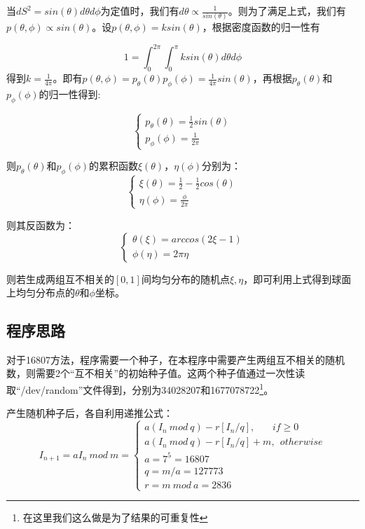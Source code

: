 \documentclass[a4paper,11pt]{article}
\begin{document}
当$d S^{2}= sin(\theta)d \theta d \phi $为定值时，我们有$d\theta \propto \frac{1}{sin(\theta)}$。则为了满足上式，我们有$p(\theta,\phi) \propto sin(\theta)$。设$p(\theta,\phi) = ksin(\theta)$，根据密度函数的归一性有

\begin{equation}
	1 = \int_{0}^{2\pi}\int_{0}^{\pi} k sin(\theta)d\theta d\phi 
\end{equation}
得到$k=\frac{1}{4\pi}$。即有$p(\theta,\phi)= p_{\theta}(\theta)p_{\phi}(\phi)=\frac{1}{4\pi}sin(\theta)$，再根据$p_{\theta}(\theta)$和$p_{\phi}(\phi)$的归一性得到:

\begin{equation}
\left\{
\begin{array}{l}
	p_{\theta}(\theta) = \frac{1}{2}sin(\theta) \\
	p_{\phi}(\phi) = \frac{1}{2\pi}
\end{array}
\right.
\end{equation}

则$p_{\theta}(\theta)$和$p_{\phi}(\phi)$的累积函数$\xi(\theta)$，$\eta(\phi)$分别为：
\begin{equation}
\left\{
\begin{array}{l}
	\xi(\theta) = \frac{1}{2}-\frac{1}{2}cos(\theta) \\
	\eta(\phi) = \frac{\phi}{2\pi}
\end{array}
\right.
\end{equation}

则其反函数为：
\begin{equation}
\left\{
\begin{array}{l}
	\theta(\xi) = arccos(2\xi-1) \\
	\phi(\eta) = 2\pi \eta 
\end{array}
\right.
\end{equation}

则若生成两组互不相关的$[0,1]$间均匀分布的随机点$\xi,\eta$，即可利用上式得到球面上均匀分布点的$\theta$和$\phi$坐标。

\subsection{程序思路}
对于16807方法，程序需要一个种子，在本程序中需要产生两组互不相关的随机数，则需要2个“互不相关”的初始种子值。这两个种子值通过一次性读取“/dev/random”文件得到，分别为34028207和1677078722\footnote{在这里我们这么做是为了结果的可重复性}。

产生随机种子后，各自利用递推公式：
\begin{equation}
	I_{n+1} = aI_{n}  \ mod \ m = \left\{
	\begin{array}{l}
	a(I_{n}\ mod \ q) - r[I_{n}/q],\ \ \ \ \ \ \ \ if \geq 0 \\
		a(I_{n}\ mod \ q) - r[I_{n}/q] + m,\ \ otherwise	 \\
		a= 7^{5} =16807 \\
		q=m/a=127773\\
		r=m \ mod \ a=2836
	\end{array} 
	\right.
\end{equation}
\end{document}
